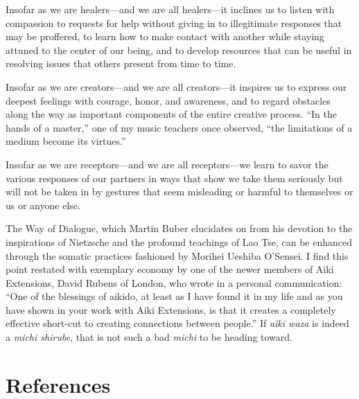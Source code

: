 Insofar as we are healers---and we are all healers---it inclines us to listen with compassion to requests for help without giving in to illegitimate responses that may be proffered, to learn how to make contact with another while staying attuned to the center of our being, and to develop resources that can be useful in resolving issues that others present from time to time. 

Insofar as we are creators---and we are all creators---it inspires us to express our deepest feelings with courage, honor, and awareness, and to regard obstacles along the way as important components of the entire creative process. ``In the hands of a master,'' one of my music teachers once observed, ``the limitations of a medium become its virtues.''

Insofar as we are receptors---and we are all receptors---we learn to savor the various responses of our partners in ways that show we take them seriously but will not be taken in by gestures that seem misleading or harmful to themselves or us or anyone else. 

The Way of Dialogue, which Martin Buber elucidates on from his devotion to the inspirations of Nietzsche and the profound teachings of Lao Tse, can be enhanced through the somatic practices fashioned by Morihei Ueshiba O'Sensei. I find this point restated with exemplary economy by one of the newer members of Aiki Extensions, David Rubens of London, who wrote in a personal communication: ``One of the blessings of aikido, at least as I have found it in my life and as you have shown in your work with Aiki Extensions, is that it creates a completely effective short-cut to creating connections between people.'' If \emph{aiki waza} is indeed a \emph{michi shirube}, that is not such a bad \emph{michi} to be heading toward.

\section*{References}

